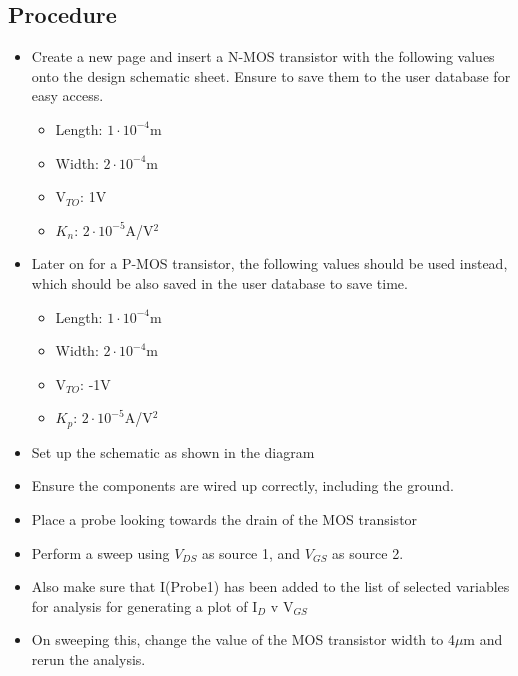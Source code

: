 \documentclass[12pt]{article}
\begin{document}
\subsection{Procedure}
\begin{itemize}
\item Create a new page and insert a N-MOS transistor with the following values onto the design schematic sheet. Ensure to save them to the user database for easy access.
\begin{itemize}
\item Length: $1\cdot10^{-4}$m
\item Width: $2\cdot10^{-4}$m
\item V$_{TO}$: 1V
\item $K_n$: $2\cdot10^{-5}$A/V${^2}$
\end{itemize}
\item Later on for a P-MOS transistor, the following values should be used instead, which should be also saved in the user database to save time.
\begin{itemize}
\item Length: $1\cdot10^{-4}$m
\item Width: $2\cdot10^{-4}$m
\item V$_{TO}$: -1V
\item $K_p$: $2\cdot10^{-5}$A/V${^2}$
\end{itemize}
\item Set up the schematic as shown in the diagram
\item Ensure the components are wired up correctly, including the ground.
\item Place a probe looking towards the drain of the MOS transistor
\item Perform a sweep using $V_{DS}$ as source 1, and $V_{GS}$ as source 2.
\item Also make sure that I(Probe1) has been added to the list of selected variables for analysis for generating a plot of I$_D$ v V$_{GS}$
\item On sweeping this, change the value of the MOS transistor width to 4$\mu$m and rerun the analysis.
\end{itemize}
\end{document}
